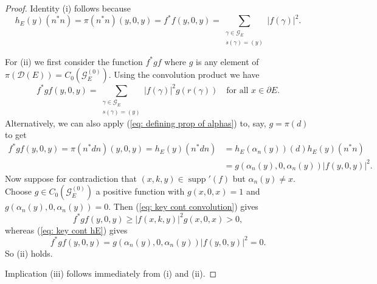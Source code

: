 \documentclass[12pt, a4paper]{amsart}
\numberwithin{equation}{section}
\theoremstyle{definition}
\theoremstyle{remark}
\begin{document}
\begin{proof}
Identity (i) follows because 
\[
h_E(y)(n^*n)=\pi(n^*n)(y,0,y)=f^*f(y,0,y)=\sum_{\substack{\gamma\in{\mathcal{G}}_E \\ 
s(\gamma)=(y)}}|f(\gamma)|^2.
\]

For (ii) we first consider the function $f^*gf$ where $g$ is any element of 
$\pi({\mathcal{D}}(E))=C_0({\mathcal{G}}_E^{(0)})$. Using the convolution product we have
\begin{equation}\label{eq: key cont convolution}
f^*gf(y,0,y)=\sum_{\substack{\gamma\in{\mathcal{G}}_E \\ 
s(\gamma)=(y)}}|f(\gamma)|^2g(r(\gamma))\quad 
\text{for all $x\in\partial E$}.
\end{equation}
Alternatively, we can also apply (\ref{eq: defining prop of alphas}) to, say, 
$g=\pi(d)$ to get
\begin{align}
f^*gf(y,0,y)=\pi(n^*dn)(y,0,y)=h_E(y)(n^*dn)&=h_E(\alpha_n(y))(d)h_E(y)(n^*n)\nonumber\\
&= g(\alpha_n(y),0,\alpha_n(y))|f(y,0,y)|^2.\label{eq: key cont hE}
\end{align}
Now suppose for contradiction that $(x,k,y)\in{\operatorname{supp}}'(f)$ but 
$\alpha_n(y)\not=x$. Choose $g\in C_0({\mathcal{G}}_E^{(0)})$ a positive function with 
$g(x,0,x)=1$ and 
$g(\alpha_n(y),0,\alpha_n(y))=0$. Then (\ref{eq: key cont convolution}) gives 
\[
f^*gf(y,0,y)\ge |f(x,k,y)|^2g(x,0,x)>0, 
\]
whereas (\ref{eq: key cont hE}) gives
\[
f^*gf(y,0,y)=g(\alpha_n(y),0,\alpha_n(y))|f(y,0,y)|^2=0.
\]
So (ii) holds. 

Implication (iii) follows immediately from (i) and (ii).
\end{proof}
\end{document}
